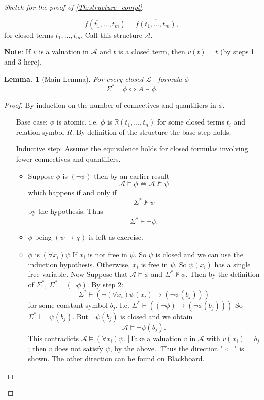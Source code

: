 \documentclass[a4paper,oneside,11pt,DIV=12,parskip=half]{scrartcl}
\newcommand{\R}{\mathbb R}
\newcommand{\LL}{\mathcal L}
\newcommand{\A}{\mathcal A}
\theoremstyle{plain}
\newtheorem{lemma}[theorem]{Lemma.}
\theoremstyle{definition}
\newtheorem{remark, definition}[theorem]{Remark and Definition.}
\newtheorem{lemma, definition}[theorem]{Lemma and Definition.}
\newtheorem{theorem, definition}[theorem]{Theorem and Definition.}
\theoremstyle{remark}
\newtheorem*{remark, example}{\textbf{Remark and Exercise}}
\begin{document}
\begin{proof}[Sketch for the proof of \ref{Th:structure_compl}]
\begin{enumerate}
\begin{itemize}
            \[ \overline{f}(\overline{t_1},\dots,t_m) = \overline{f(t_1,\dots,t_m)}, \]
        for closed terms $t_1,\dots,t_m$. Call this structure $\A$.
    \end{itemize}
    \textbf{Note}: If $v$ is a valuation in $\A$ and $t$ is a closed term, then $v(t) = \overline{t}$ (by steps 1 and 3 here).
\end{enumerate}
\begin{lemma}[Main Lemma]
For every closed $\LL^+$-formula $\phi$
    \[ \Sigma^* \vdash \phi \Leftrightarrow A \vDash \phi. \]
\end{lemma}
\begin{proof}
By induction on the number of connectives and quantifiers in $\phi$.
\begin{itemize}
    \item[Base case:] $\phi$ is atomic, i.e. $\phi$ is $\R(t_1,\dots,t_n)$ for some closed terms $t_i$ and relation symbol $R$. By definition of the structure the base step holds.
    \item[Inductive step:] Assume the equivalence holds for closed formulas involving fewer connectives and quantifiers.
   \begin{itemize}
       \item  Suppose $\phi$ is $(\lnot \psi)$ then by an earlier result
        \[ \A \vDash \phi \Leftrightarrow \A \not \vDash \psi \]
    which happens if and only if
        \[ \Sigma^* \not \vdash \psi \]
    by the hypothesis.
    Thus
        \[ \Sigma^* \vdash \lnot \psi. \]
    \item $\phi$ being $(\psi \rightarrow \chi)$ is left as exercise.
    \item $\phi$ is $(\forall x_i) \psi$
    If $x_i$ is not free in $\psi$. So $\psi$ is closed and we can use the induction hypothesis.
    Otherwise, $x_i$ is free in $\psi$. So $\psi(x_i)$ has a single free variable.
    Now Suppose that $\A \vDash \phi$ and $\Sigma^* \not \vdash \phi$. Then by the definition of $\Sigma^*$, $\Sigma^* \vdash (\lnot \phi)$.
    By step 2:
    \[ \Sigma^* \vdash (\lnot(\forall x_i) \psi(x_i) \rightarrow (\lnot \psi(b_j))) \]
    for some constant symbol $b_j$.
    I.e. $\Sigma^* \vdash ((\lnot \phi) \rightarrow (\lnot \phi(b_j)))$ So $\Sigma^* \vdash \lnot \psi(b_j)$.
    But $ \lnot \psi(b_j)$ is closed and we obtain
        \[ \A \vDash \lnot \psi(b_j). \]
        This contradicts $\A \vDash (\forall x_i) \psi$.
        [Take a valuation $v$ in $\A$ with $v(x_i) = b_j$; then $v$ does not satisfy $\psi$, by the above.]
    Thus the direction "$\Leftarrow$" is shown. The other direction can be found on Blackboard.
    \end{itemize} 
\end{itemize}
\end{proof}

\end{proof}
\end{document}
